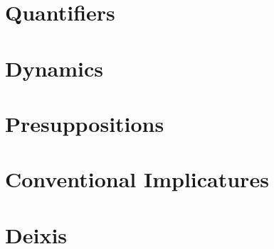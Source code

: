 \documentclass{report}
\begin{document}
\section{Quantifiers}
\section{Dynamics}
\section{Presuppositions}
\section{Conventional Implicatures}
\section{Deixis}



\nocite{de2001towards}


\end{document}
